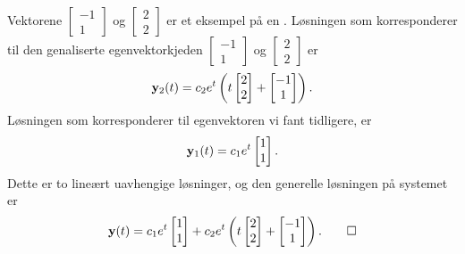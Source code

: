 \begin{ex}
Vektorene 
$
\begin{bmatrix}
-1  \\
1 
\end{bmatrix}
$
og 
$
\begin{bmatrix}
2  \\
2 
\end{bmatrix}
$
er et eksempel på en . 
Løsningen som korresponderer til den genaliserte egenvektorkjeden 
$
\begin{bmatrix}
-1  \\
1 
\end{bmatrix}
$
og 
$
\begin{bmatrix}
2  \\
2 
\end{bmatrix}
$
er 
\[
\mathbf{y}_2(t) = c_2 e^t
\left(
t
\begin{bmatrix}
2  \\
2 
\end{bmatrix}
+
\begin{bmatrix}
-1  \\
1 
\end{bmatrix}
\right).
\]
Løsningen som korresponderer til egenvektoren 
vi fant tidligere, er 
\[
\mathbf{y}_1(t) = c_1 e^t
\begin{bmatrix}
1  \\
1 
\end{bmatrix}.
\]
Dette er to lineært uavhengige løsninger, og den generelle løsningen på systemet er 
\[
\mathbf{y}(t) = c_1 e^t
\begin{bmatrix}
1  \\
1 
\end{bmatrix}
+ c_2 e^t
\left(
t
\begin{bmatrix}
2  \\
2 
\end{bmatrix}
+
\begin{bmatrix}
-1  \\
1 
\end{bmatrix}
\right).\qedhere
\]
\end{ex}

\kapittelslutt

